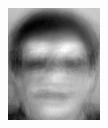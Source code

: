 \begin{frame}
\begin{columns}
\begin{overlayarea}{\textwidth}{\textheight}
{\begin{minipage}[t]{0.15\textwidth}
          \includegraphics[width=\textwidth]{images/eig_docked_image/eig_2.jpeg}
        \end{minipage}
        \begin{minipage}[t]{0.15\textwidth}

\end{minipage}}
\end{overlayarea}
\end{columns}
\end{frame}
